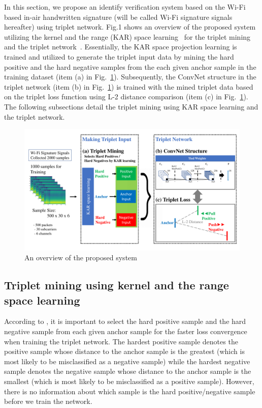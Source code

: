 \documentclass[runningheads]{llncs}
\begin{document}
In this section, we propose an identify verification system based on the Wi-Fi based in-air handwritten signature (will be called Wi-Fi signature signals hereafter) using triplet network. Fig.1 shows an overview of the proposed system utilizing the kernel and the range (KAR) space learning~\cite{toh2018learning,toh2018gradient} for the triplet mining and the triplet network~\cite{schroff2015facenet}.
Essentially, the KAR space projection learning is trained and utilized to generate the triplet input data by mining the hard positive and the hard negative samples from the each given anchor sample in the training dataset (item (a) in Fig.~\ref{fig1}).
Subsequently, the ConvNet structure in the triplet network (item (b) in Fig.~\ref{fig1}) is trained with the mined triplet data based on the triplet loss function using L-2 distance comparison (item (c) in Fig.~\ref{fig1}).
The following subsections detail the triplet mining using KAR space learning and the triplet network.

\begin{figure}
    \includegraphics[width=\textwidth]{fig1_tcnn_kar_v4}
    \caption{An overview of the proposed system} \label{fig1}
\end{figure}

\subsection{Triplet mining using kernel and the range space learning}
According to \cite{schroff2015facenet}, it is important to select the hard positive sample and the hard negative sample from each given anchor sample for the faster loss convergence when training the triplet network.
The hardest positive sample denotes the positive sample whose distance to the anchor sample is the greatest (which is most likely to be misclassified as a negative sample) while the hardest negative sample denotes the negative sample whose distance to the anchor sample is the smallest (which is most likely to be misclassified as a positive sample). However, there is no information about which sample is the hard positive/negative sample before we train the network.
\end{document}
